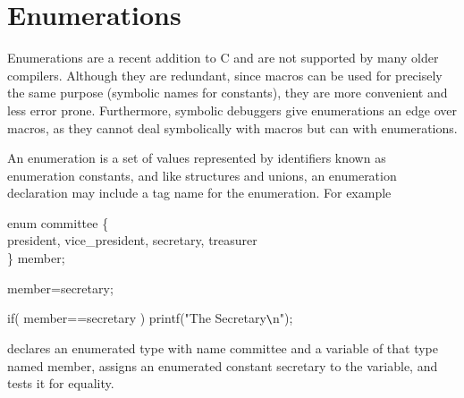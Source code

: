 \section{Enumerations}
     Enumerations are  a recent  addition to  C and  are not
supported by many older compilers.  Although they are redundant,
since macros can be used for precisely  the same  purpose  (symbolic
names for  constants), they are more convenient and less error
prone.  Furthermore, symbolic debuggers  give enumerations an edge over
macros, as they cannot deal symbolically with macros but can with
enumerations.

An enumeration  is a  set of  values represented  by identifiers
known as {\kc enumeration constants\/}, and like structures  and
unions, an enumeration declaration  may include a tag name 
for the
enumeration.  For example
 \begin{code}
  enum committee \{ \\
  \> president, vice\_president, secretary, treasurer \\
  \} member; \addVspace

  member=secretary; \addVspace

  if( member==secretary ) printf("The Secretary\verb+\+n");
\end{code}
\noindent
 declares an enumerated type with name {\cd committee} and a variable
of that type named {\cd member}, assigns an enumerated constant {\cd
secretary} to the variable, and tests it for equality.

